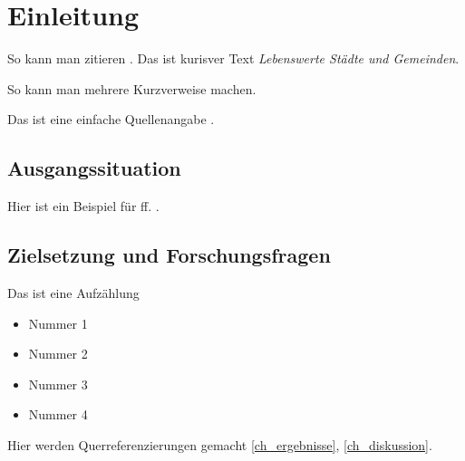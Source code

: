 \chapter{Einleitung}\label{ch_einleitung}

So kann man zitieren \parencites[17]{hesse2018}[239]{zimmermann2023}. Das ist kurisver Text \textit{Lebenswerte Städte und Gemeinden}.

So kann man mehrere Kurzverweise machen\parencites[29]{birk2020}{bbsr2019}{deutscherstaedtetag2018}{uba2022}[246]{zimmermann2023}. 

Das ist eine einfache Quellenangabe \parencite[13]{schwedes2013a}. 


\section{Ausgangssituation}

Hier ist ein Beispiel für ff. \parencite[96\psq]{piesold2021}. 


\section{Zielsetzung und Forschungsfragen}\label{ch_zielsetzung}


Das ist eine Aufzählung
\begin{itemize}
    \item Nummer 1
    \item Nummer 2
    \item Nummer 3
    \item Nummer 4
\end{itemize}

Hier werden Querreferenzierungen gemacht \autoref{ch_ergebnisse}, \autoref{ch_diskussion}.